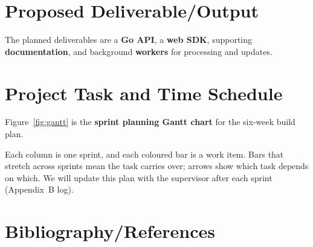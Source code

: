 \section{Proposed Deliverable/Output}

The planned deliverables are a \textbf{Go API}, a \textbf{web SDK}, supporting \textbf{documentation},
and background \textbf{workers} for processing and updates.

\section{Project Task and Time Schedule}

Figure~\ref{fig:gantt} is the \textbf{sprint planning Gantt chart} for the six-week build plan.

Each column is one sprint, and each coloured bar is a work item. Bars that stretch across
sprints mean the task carries over; arrows show which task depends on which. We will update
this plan with the supervisor after each sprint (Appendix~B log).

\section{Bibliography/References}

